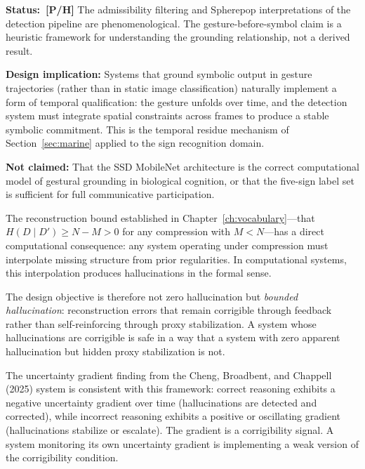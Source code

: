 \begin{constraintboundary}
\textbf{Status:~\textbf{[P/H]}} The admissibility filtering and Spherepop
interpretations of the detection pipeline are phenomenological. The gesture-before-symbol
claim is a heuristic framework for understanding the grounding relationship,
not a derived result.

\textbf{Design implication:} Systems that ground symbolic output in gesture
trajectories (rather than in static image classification) naturally implement a
form of temporal qualification: the gesture unfolds over time, and the detection
system must integrate spatial constraints across frames to produce a stable
symbolic commitment. This is the temporal residue mechanism of Section~\ref{sec:marine}
applied to the sign recognition domain.

\textbf{Not claimed:} That the SSD MobileNet architecture is the correct
computational model of gestural grounding in biological cognition, or that the
five-sign label set is sufficient for full communicative participation.
\end{constraintboundary}

The reconstruction bound established in Chapter~\ref{ch:vocabulary}---that
$H(D \mid D') \geq N - M > 0$ for any compression with $M < N$---has a direct
computational consequence: any system operating under compression must interpolate
missing structure from prior regularities. In computational systems, this
interpolation produces hallucinations in the formal sense.

\claimD The design objective is therefore not zero hallucination but
\emph{bounded hallucination}: reconstruction errors that remain corrigible through
feedback rather than self-reinforcing through proxy stabilization. A system whose
hallucinations are corrigible is safe in a way that a system with zero apparent
hallucination but hidden proxy stabilization is not.

\claimC The uncertainty gradient finding from the Cheng, Broadbent, and Chappell
(2025) system is consistent with this framework: correct reasoning exhibits a
negative uncertainty gradient over time (hallucinations are detected and corrected),
while incorrect reasoning exhibits a positive or oscillating gradient (hallucinations
stabilize or escalate). The gradient is a corrigibility signal. A system monitoring
its own uncertainty gradient is implementing a weak version of the corrigibility
condition.

